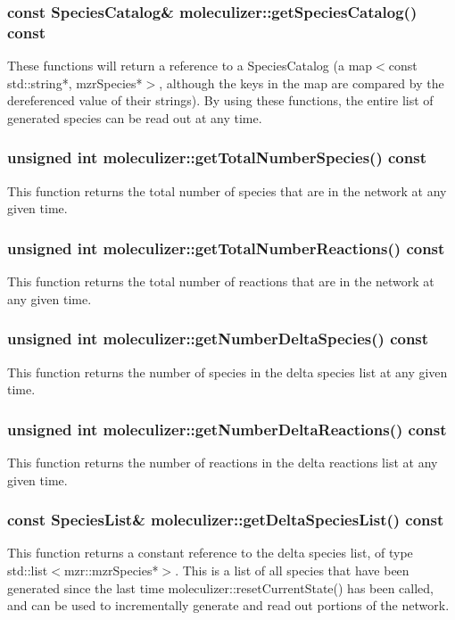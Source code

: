 \subsubsection{const SpeciesCatalog\& moleculizer::getSpeciesCatalog()
  const}
These functions will return a reference to a SpeciesCatalog (a
map$<$const std::string*, mzrSpecies*$>$, although the keys in the map are
compared by the dereferenced value of their strings).  By using these
functions, the entire list of generated species can be read out at any
time.  

\subsubsection{unsigned int moleculizer::getTotalNumberSpecies()
  const}
This function returns the total number of species that are in the
network at any given time.

\subsubsection{unsigned int moleculizer::getTotalNumberReactions()
  const}
This function returns the total number of reactions that are in the
network at any given time.

\subsubsection{unsigned int moleculizer::getNumberDeltaSpecies()
  const}
This function returns the number of species in the delta species list
at any given time.

\subsubsection{unsigned int moleculizer::getNumberDeltaReactions()
  const}
This function returns the number of reactions in the delta reactions
list at any given time. 

\subsubsection{const SpeciesList\& moleculizer::getDeltaSpeciesList()
  const}
This function returns a constant reference to the delta species list,
of type std::list$<$mzr::mzrSpecies*$>$.  This is a list of all species
that have been generated since the last time
moleculizer::resetCurrentState() has been called, and can be used to
incrementally generate and read out portions of the network.

